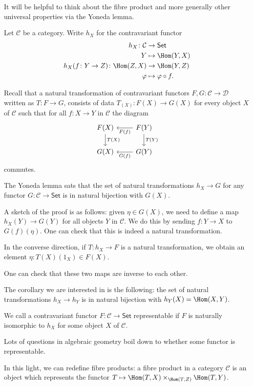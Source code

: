 It will be helpful to think about the fibre product and more generally
other universal properties via the Yoneda lemma.

Let $\mathcal{C}$ be a category. Write $h_X$ for the contravariant functor
\begin{align*}
	h_X\colon \mathcal{C}&\to \mathsf{Set}\\
	Y&\mapsto \Hom(Y, X)\\
	h_X(f\colon Y\to Z)\colon \Hom(Z, X)&\to \Hom(Y, Z)\\
	\varphi &\mapsto \varphi \circ f.
\end{align*}

Recall that a natural transformation of contravariant functors
$F, G\colon \mathcal{C}\to \mathcal{D}$ written as $T\colon F\to G$, consists
of data $T_(X)\colon F(X)\to G(X)$ for every object $X$ of $\mathcal{C}$ such
that for  all $f\colon X\to Y$ in $\mathcal{C}$ the diagram
\[\begin{tikzcd}
	F(X)\ar[d, "T(X)"] & F(Y)\ar[l, "F(f)"]\ar[d, "T(Y)"]\\
	G(X)& G(Y)\ar[l, "G(f)"]
\end{tikzcd}\]
commutes.

The Yoneda lemma sats that the set of natural transformations
$h_X\to G$ for any functor $G\colon \mathcal{C}\to \mathsf{Set}$ is in natural
bijection with  $G(X)$.

A sketch of the proof is as follows: given $\eta \in G(X)$, we need to define a map
$h_X(Y)\to G(Y)$ for all objects $Y$ in $\mathcal{C}$. We do this by sending
$f\colon Y\to X$ to $G(f)(\eta)$. One can check that this is indeed a natural
transformation.

In the converse direction, if $T\colon h_X\to F$ is a natural transformation,
we obtain an element $\eta \colon T(X)(1_X) \in F(X)$.

One can check that these two maps are inverse to each other.

The corollary we are interested in is the following: the set of natural transformations
$h_X \to h_Y$ is in natural bijection with $h_Y(X) = \Hom(X, Y)$.

We call a contravariant functor $F\colon \mathcal{C}\to \mathsf{Set}$ representable
if $F$ is naturally isomorphic to $h_X$ for some object $X$ of $\mathcal{C}$.

Lots of questions in algebraic geometry boil down to whether some functor is
representable.

In this light, we can redefine fibre products: a fibre product in a category
$\mathcal{C}$ is an object which represents the functor
$T \mapsto \Hom(T, X) \times_{\Hom(T, Z)} \Hom(T, Y)$.

